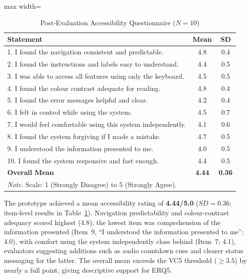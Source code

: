 \documentclass[journal,onecolumn]{IEEEtran}
\begin{document}
\begin{table}[htbp]
\centering
\caption{Post-Evaluation Accessibility Questionnaire ($N=10$)}
\label{tab:a11y-questionnaire}
\small
\begin{adjustbox}{max width=\columnwidth}
\begin{tabular}{|p{5.5cm}|c|c|}
\hline
\textbf{Statement} & \textbf{Mean} & \textbf{SD} \\
\hline
1. I found the navigation consistent and predictable. & 4.8 & 0.4 \\
\hline
2. I found the instructions and labels easy to understand. & 4.4 & 0.5 \\
\hline
3. I was able to access all features using only the keyboard. & 4.5 & 0.5 \\
\hline
4. I found the colour contrast adequate for reading. & 4.8 & 0.4 \\
\hline
5. I found the error messages helpful and clear. & 4.2 & 0.4 \\
\hline
6. I felt in control while using the system. & 4.5 & 0.7 \\
\hline
7. I would feel comfortable using this system independently. & 4.1 & 0.6 \\
\hline
8. I found the system forgiving if I made a mistake. & 4.7 & 0.5 \\
\hline
9. I understood the information presented to me. & 4.0 & 0.5 \\
\hline
10. I found the system responsive and fast enough. & 4.4 & 0.5 \\
\hline
\textbf{Overall Mean} & \textbf{4.44} & \textbf{0.36} \\
\hline
\multicolumn{3}{l}{\footnotesize\textit{Note.} Scale: 1 (Strongly Disagree) to 5 (Strongly Agree).}
\end{tabular}
\end{adjustbox}
\end{table}

The prototype achieved a mean accessibility rating of \textbf{4.44/5.0} ($SD = 0.36$; item-level results in Table~\ref{tab:a11y-questionnaire}). Navigation predictability and colour-contrast adequacy scored highest (4.8); the lowest item was comprehension of the information presented (Item~9, ``I understood the information presented to me''; 4.0), with comfort using the system independently close behind (Item~7; 4.1), evaluators suggesting additions such as audio countdown cues and clearer status messaging for the latter. The overall mean exceeds the VC5 threshold ($\geq 3.5$) by nearly a full point, giving descriptive support for ERQ5.
\end{document}
